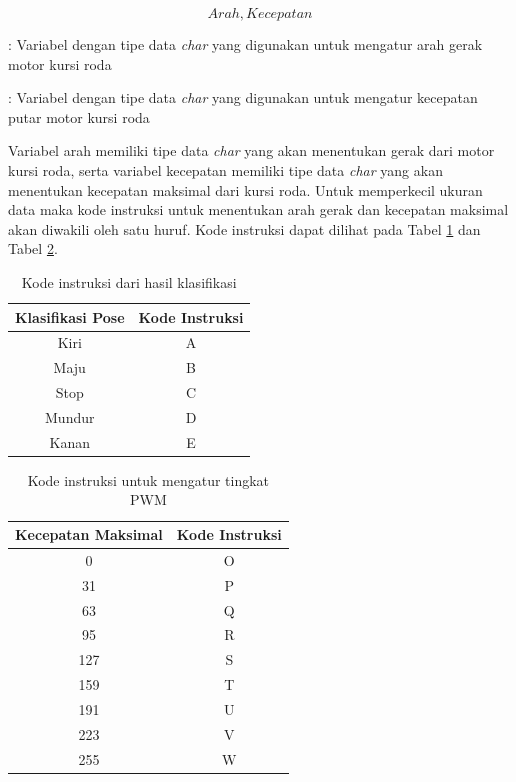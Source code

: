 \begin{equation}
  \label{eq:paket-data}
    Arah,Kecepatan
\end{equation}

\begin{description}[nolistsep]
  \item[Keterangan]
  \item[Arah] : Variabel dengan tipe data \emph{char} yang digunakan untuk mengatur arah gerak motor kursi roda
  \item[Kecepatan] : Variabel dengan tipe data \emph{char} yang digunakan untuk mengatur kecepatan putar motor kursi roda 
\end{description}

Variabel arah memiliki tipe data \emph{char} yang akan menentukan gerak dari motor kursi roda, serta variabel kecepatan memiliki tipe data \emph{char} yang akan menentukan kecepatan maksimal dari kursi roda. Untuk memperkecil ukuran data maka kode instruksi untuk menentukan arah gerak dan kecepatan maksimal akan diwakili oleh satu huruf. Kode instruksi dapat dilihat pada Tabel \ref{tbl:kode-instruksi} dan Tabel \ref{tbl:kodePWM}. 

\begin{longtable}{|c|c|}
    \caption{Kode instruksi dari hasil klasifikasi}
    \label{tbl:kode-instruksi}\\
        \hline
        Klasifikasi Pose & Kode Instruksi \\ \hline
        \endfirsthead
        \endhead
        Kiri             & A              \\ \hline
        Maju             & B              \\ \hline
        Stop             & C              \\ \hline
        Mundur           & D              \\ \hline
        Kanan            & E              \\ \hline
\end{longtable}


\begin{longtable}{|c|c|}
  \caption{Kode instruksi untuk mengatur tingkat PWM}
  \label{tbl:kodePWM}\\
  \hline
  Kecepatan Maksimal & Kode Instruksi \\ \hline
  \endfirsthead
  \endhead
  0                     & O              \\ \hline
  31                    & P              \\ \hline
  63                    & Q              \\ \hline
  95                    & R              \\ \hline
  127                   & S              \\ \hline
  159                   & T              \\ \hline
  191                   & U              \\ \hline
  223                   & V              \\ \hline
  255                   & W              \\ \hline
  \end{longtable}

